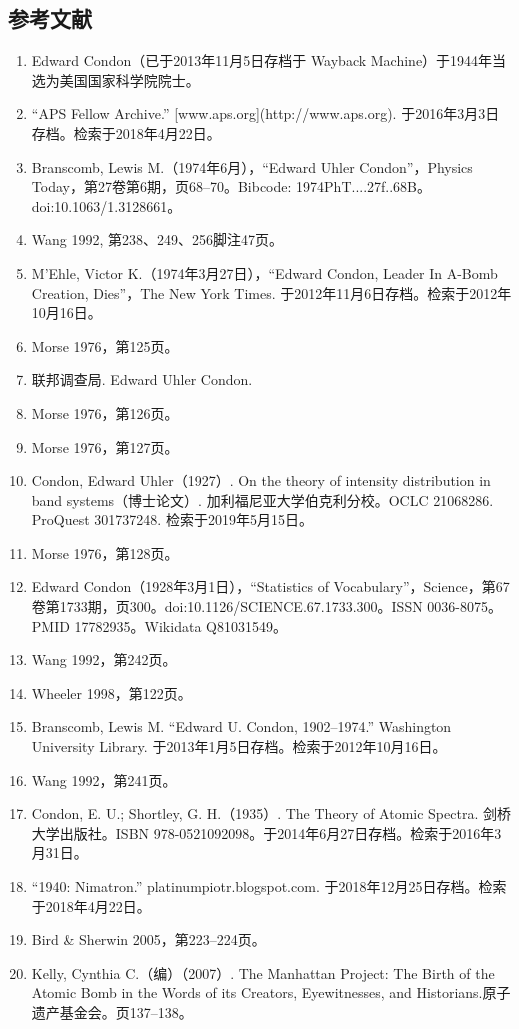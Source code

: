 \subsection{参考文献}
\begin{enumerate}
\item Edward Condon（已于2013年11月5日存档于 Wayback Machine）于1944年当选为美国国家科学院院士。
\item “APS Fellow Archive.” [www.aps.org](http://www.aps.org). 于2016年3月3日存档。检索于2018年4月22日。
\item Branscomb, Lewis M.（1974年6月），“Edward Uhler Condon”，Physics Today，第27卷第6期，页68–70。Bibcode: 1974PhT....27f..68B。doi:10.1063/1.3128661。
\item Wang 1992, 第238、249、256脚注47页。
\item M’Ehle, Victor K.（1974年3月27日），“Edward Condon, Leader In A-Bomb Creation, Dies”，The New York Times. 于2012年11月6日存档。检索于2012年10月16日。
\item Morse 1976，第125页。
\item 联邦调查局. Edward Uhler Condon.
\item Morse 1976，第126页。
\item Morse 1976，第127页。
\item Condon, Edward Uhler（1927）. On the theory of intensity distribution in band systems（博士论文）. 加利福尼亚大学伯克利分校。OCLC 21068286. ProQuest 301737248. 检索于2019年5月15日。
\item Morse 1976，第128页。
\item Edward Condon（1928年3月1日），“Statistics of Vocabulary”，Science，第67卷第1733期，页300。doi:10.1126/SCIENCE.67.1733.300。ISSN 0036-8075。PMID 17782935。Wikidata Q81031549。
\item Wang 1992，第242页。
\item Wheeler 1998，第122页。
\item Branscomb, Lewis M. “Edward U. Condon, 1902–1974.” Washington University Library. 于2013年1月5日存档。检索于2012年10月16日。
\item Wang 1992，第241页。
\item Condon, E. U.; Shortley, G. H.（1935）. The Theory of Atomic Spectra. 剑桥大学出版社。ISBN 978-0521092098。于2014年6月27日存档。检索于2016年3月31日。
\item “1940: Nimatron.” platinumpiotr.blogspot.com. 于2018年12月25日存档。检索于2018年4月22日。
\item Bird & Sherwin 2005，第223–224页。
\item Kelly, Cynthia C.（编）（2007）. The Manhattan Project: The Birth of the Atomic Bomb in the Words of its Creators, Eyewitnesses, and Historians.原子遗产基金会。页137–138。

\end{enumerate}
